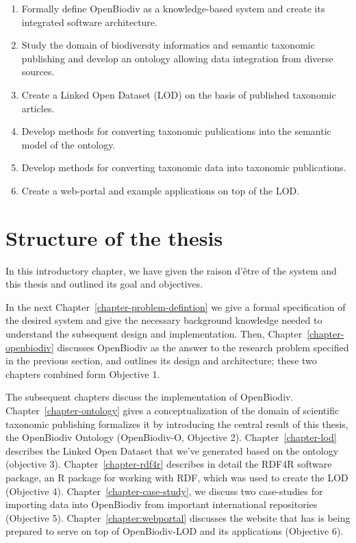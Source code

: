 \begin{enumerate}
\item{Formally define OpenBiodiv as a knowledge-based system and create its integrated software architecture.}
\item{Study the domain of biodiversity informatics and semantic taxonomic publishing and develop an ontology allowing data integration from diverse sources.}
\item{Create a Linked Open Dataset (LOD) on the basis of published taxonomic articles.}
\item{Develop methods for converting taxonomic publications into the semantic model of the ontology.}
\item{Develop methods for converting taxonomic data into taxonomic publications.}
\item{Create a web-portal and example applications on top of the LOD.}
\end{enumerate}


\section{Structure of the thesis}

In this introductory chapter, we have given the raison d'\^etre of the system and this thesis and outlined its goal and objectives. 

In the next Chapter~\ref{chapter-problem-defintion} we give a formal specification of the desired system and give the necessary background knowledge needed to understand the subsequent design and implementation. Then, Chapter~\ref{chapter-openbiodiv} discusses OpenBiodiv as the answer to the research problem specified in the previous section, and outlines its design and architecture; these two chapters combined form Objective 1.

The subsequent chapters discuss the implementation of OpenBiodiv. Chapter~\ref{chapter-ontology} gives a conceptualization of the domain of scientific taxonomic publishing formalizes it by introducing the central result of this thesis, the OpenBiodiv Ontology (OpenBiodiv-O, Objective 2). Chapter~\ref{chapter-lod} describes the Linked Open Dataset that we've generated based on the ontology (objective 3). Chapter~\ref{chapter-rdf4r} describes in detail the RDF4R software package, an R package for working with RDF, which was used to create the LOD (Objective 4). Chapter~\ref{chapter-case-study}, we discuss two case-studies for importing data into OpenBiodiv from important international repositories (Objective 5). Chapter~\ref{chapter:webportal} discusses the website that has is being prepared to serve on top of OpenBiodiv-LOD and its applications (Objective 6).







